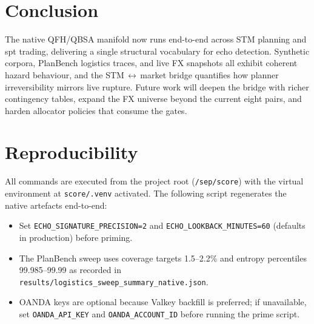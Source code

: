 \documentclass[11pt]{article}
\begin{document}
\section{Conclusion}
The native QFH/QBSA manifold now runs end-to-end across STM planning and spt trading, delivering a single structural vocabulary for echo detection. Synthetic corpora, PlanBench logistics traces, and live FX snapshots all exhibit coherent hazard behaviour, and the STM\,$\leftrightarrow$\,market bridge quantifies how planner irreversibility mirrors live rupture. Future work will deepen the bridge with richer contingency tables, expand the FX universe beyond the current eight pairs, and harden allocator policies that consume the gates.

\appendix
\section{Reproducibility}
All commands are executed from the project root (\texttt{/sep/score}) with the virtual environment at \texttt{score/.venv} activated.
The following script regenerates the native artefacts end-to-end:
\begin{itemize}
  \item Set \texttt{ECHO\_SIGNATURE\_PRECISION=2} and \texttt{ECHO\_LOOKBACK\_MINUTES=60} (defaults in production) before priming.
  \item The PlanBench sweep uses coverage targets 1.5--2.2\% and entropy percentiles 99.985--99.99 as recorded in \texttt{results/logistics\_sweep\_summary\_native.json}.
  \item OANDA keys are optional because Valkey backfill is preferred; if unavailable, set \texttt{OANDA\_API\_KEY} and \texttt{OANDA\_ACCOUNT\_ID} before running the prime script.
\end{itemize}
\end{document}
